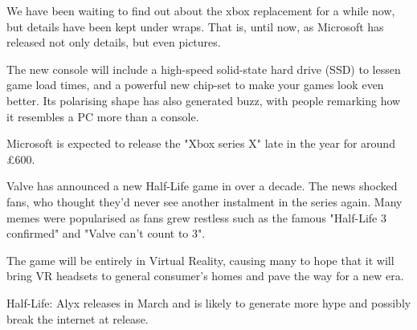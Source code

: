 \documentclass{article}
\begin{document}
\closearticle

\pagebreak



\begin{multicols}{2}
We have been waiting to find out about the xbox replacement for a while now, but details have been kept under wraps. That is, until now, as Microsoft has released not only details, but even pictures.

The new console will include a high-speed solid-state hard drive (SSD) to lessen game load times, and a powerful new chip-set to make your games look even better. Its polarising shape has also generated buzz, with people remarking how it resembles a PC more than a console.

Microsoft is expected to release the "Xbox series X" late in the year for around £600.


Valve has announced a new Half-Life game in over a decade. The news shocked fans, who thought they'd never see another instalment in the series again. Many memes were popularised as fans grew restless such as the famous "Half-Life 3 confirmed" and "Valve can't count to 3".

The game will be entirely in Virtual Reality, causing many to hope that it will bring VR headsets to general consumer's homes and pave the way for a new era. 

Half-Life: Alyx releases in March and is likely to generate more hype and possibly break the internet at release.


\end{multicols}
\closearticle
\end{document}
